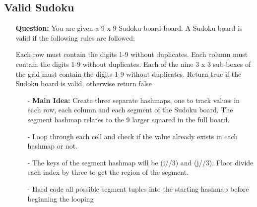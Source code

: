 \documentclass[12pt]{article}
\begin{document}
\subsection{Valid Sudoku}
\begin{enumerate}
  \item[] \textbf{Question:} You are given a 9 x 9 Sudoku board board. A Sudoku board is valid if the following rules are followed:

Each row must contain the digits 1-9 without duplicates.
Each column must contain the digits 1-9 without duplicates.
Each of the nine 3 x 3 sub-boxes of the grid must contain the digits 1-9 without duplicates.
Return true if the Sudoku board is valid, otherwise return false

    \begin{enumerate}
      \item[-] \textbf{Main Idea: } Create three separate hashmaps, one to track values in each row, each column and each segment of the Sudoku board. The segment hashmap relates to the 9 larger squared in the full board.
      \item[-] Loop through each cell and check if the value already exists in each hashmap or not. 
      \item[-] The keys of the segment hashmap will be (i//3) and (j//3). Floor divide each index by three to get the region of the segment.
      \item[-] Hard code all possible segment tuples into the starting hashmap before beginning the looping
    \end{enumerate}
\end{enumerate}
\end{document}
